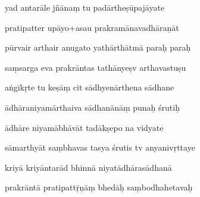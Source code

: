 \documentclass[article,12pt,a4paper]{memoir}%
\newcounter{parCount}
\begin{document}
	  
	  \pstart {} yad antarāle jñānaṃ tu padārtheṣūpajāyate 
	{}
	\pend%
      

	  
	  \pstart \leavevmode%
	pratipatter upāyo+asau prakramānavadhāraṇāt 
	{}
	\pend%
      

	  
	  \pstart {} pūrvair arthair anugato yathārthātmā paraḥ paraḥ 
	{}
	\pend%
      

	  
	  \pstart \leavevmode%
	saṃsarga eva prakrāntas tathānyeṣv arthavastuṣu 
	{}
	\pend%
      

	  
	  \pstart {} aṅgīkṛte tu keṣāṃ cit sādhyenārthena sādhane 
	{}
	\pend%
      

	  
	  \pstart \leavevmode%
	ādhāraniyamārthaiva sādhanānāṃ punaḥ śrutiḥ 
	{}
	\pend%
      

	  
	  \pstart {} ādhāre niyamābhāvāt tadākṣepo na vidyate 
	{}
	\pend%
      

	  
	  \pstart \leavevmode%
	sāmarthyāt saṃbhavas tasya śrutis tv anyanivṛttaye 
	{}
	\pend%
      

	  
	  \pstart {} kriyā kriyāntarād bhinnā niyatādhārasādhanā 
	{}
	\pend%
      

	  
	  \pstart \leavevmode%
	prakrāntā pratipattṝṇāṃ bhedāḥ saṃbodhahetavaḥ 
	{}
	\pend%
      
\end{document}
